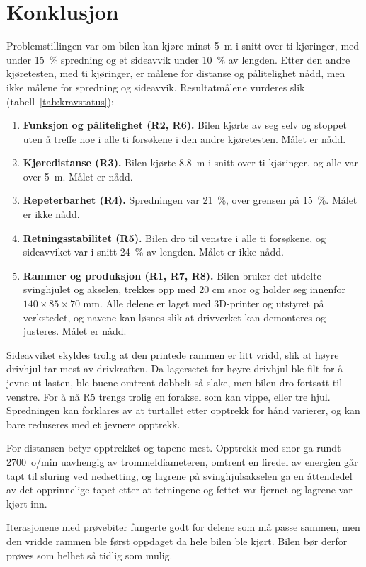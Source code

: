 \section{Konklusjon}
\label{sec:konklusjon}
Problemstillingen var om bilen kan kjøre minst \SI{5}{m} i snitt over ti kjøringer, med under \SI{15}{\percent} spredning og et sideavvik under \SI{10}{\percent} av lengden. Etter den andre kjøretesten, med ti kjøringer, er målene for distanse og pålitelighet nådd, men ikke målene for spredning og sideavvik. Resultatmålene vurderes slik (tabell~\ref{tab:kravstatus}):
\begin{enumerate}
    \item \textbf{Funksjon og pålitelighet (R2, R6).} Bilen kjørte av seg selv og stoppet uten å treffe noe i alle ti forsøkene i den andre kjøretesten. Målet er nådd.
    \item \textbf{Kjøredistanse (R3).} Bilen kjørte \SI{8,8}{m} i snitt over ti kjøringer, og alle var over \SI{5}{m}. Målet er nådd.
    \item \textbf{Repeterbarhet (R4).} Spredningen var \SI{21}{\percent}, over grensen på \SI{15}{\percent}. Målet er ikke nådd.
    \item \textbf{Retningsstabilitet (R5).} Bilen dro til venstre i alle ti forsøkene, og sideavviket var i snitt \SI{24}{\percent} av lengden. Målet er ikke nådd.
    \item \textbf{Rammer og produksjon (R1, R7, R8).} Bilen bruker det utdelte svinghjulet og akselen, trekkes opp med 20 cm snor og holder seg innenfor $140 \times 85 \times 70$ mm. Alle delene er laget med 3D-printer og utstyret på verkstedet, og navene kan løsnes slik at drivverket kan demonteres og justeres. Målet er nådd.
\end{enumerate}

Sideavviket skyldes trolig at den printede rammen er litt vridd, slik at høyre drivhjul tar mest av drivkraften. Da lagersetet for høyre drivhjul ble filt for å jevne ut lasten, ble buene omtrent dobbelt så slake, men bilen dro fortsatt til venstre. For å nå R5 trengs trolig en foraksel som kan vippe, eller tre hjul. Spredningen kan forklares av at turtallet etter opptrekk for hånd varierer, og kan bare reduseres med et jevnere opptrekk.

For distansen betyr opptrekket og tapene mest. Opptrekk med snor ga rundt \SI{2700}{o/min} uavhengig av trommeldiameteren, omtrent en firedel av energien går tapt til sluring ved nedsetting, og lagrene på svinghjulsakselen ga en åttendedel av det opprinnelige tapet etter at tetningene og fettet var fjernet og lagrene var kjørt inn.

Iterasjonene med prøvebiter fungerte godt for delene som må passe sammen, men den vridde rammen ble først oppdaget da hele bilen ble kjørt. Bilen bør derfor prøves som helhet så tidlig som mulig.
